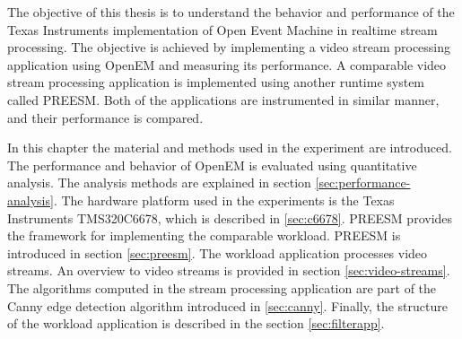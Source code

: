 The objective of this thesis is to understand the behavior and performance of the Texas Instruments implementation of Open Event Machine in realtime stream processing. The objective is achieved by implementing a video stream processing application using OpenEM and measuring its performance. A comparable video stream processing application is implemented using another runtime system called PREESM. Both of the applications are instrumented in similar manner, and their performance is compared.

In this chapter the material and methods used in the experiment are introduced. The performance and behavior of OpenEM is evaluated using quantitative analysis. The analysis methods are explained in section \ref{sec:performance-analysis}. The hardware platform used in the experiments is the Texas Instruments TMS320C6678, which is described in \ref{sec:c6678}. PREESM provides the framework for implementing the comparable workload. PREESM is introduced in section \ref{sec:preesm}. The workload application processes video streams. An overview to video streams is provided in section \ref{sec:video-streams}. The algorithms computed in the stream processing application are part of the Canny edge detection algorithm introduced in \ref{sec:canny}. Finally, the structure of the workload application is described in the section \ref{sec:filterapp}.
